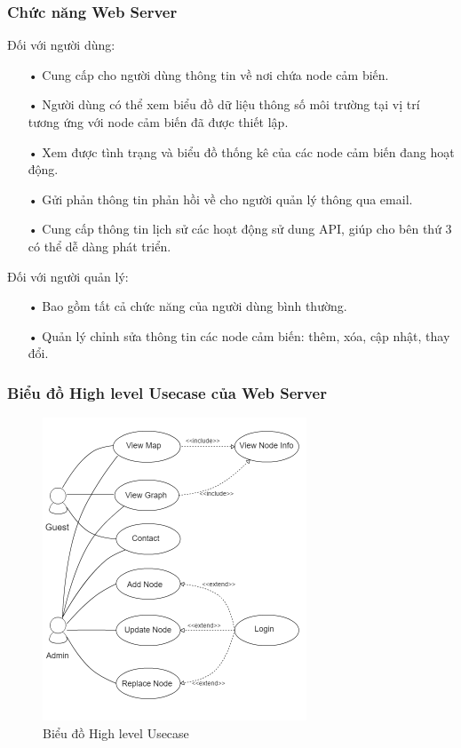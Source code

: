 \subsubsection*{Chức năng Web Server}
Đối với người dùng:
\begin{itemize}
\item[•] Cung cấp cho người dùng thông tin về nơi chứa node cảm biến.
\item[•] Người dùng có thể xem biểu đồ dữ liệu thông số môi trường tại vị trí tương ứng với node cảm biến đã được thiết lập.
\item[•] Xem được tình trạng và biểu đồ thống kê của các node cảm biến đang hoạt động.
\item[•] Gửi phản thông tin phản hồi về cho người quản lý thông qua email.
\item[•] Cung cấp thông tin lịch sử các hoạt động sử dung API, giúp cho bên thứ 3 có thể dễ dàng phát triển.
\end{itemize}

Đối với người quản lý:
\begin{itemize}
\item[•] Bao gồm tất cả chức năng của người dùng bình thường.
\item[•] Quản lý chỉnh sửa thông tin các node cảm biến: thêm, xóa, cập nhật, thay đổi.
\end{itemize}

\subsubsection*{Biểu đồ High level Usecase của Web Server}

\begin{figure}[H]
\centering    
\includegraphics[width=0.7\textwidth]{usecase_diagram}
\caption[Biểu đồ High level Usecase]{Biểu đồ High level Usecase }
\label{fig:usecase_diagram}
\end{figure}

